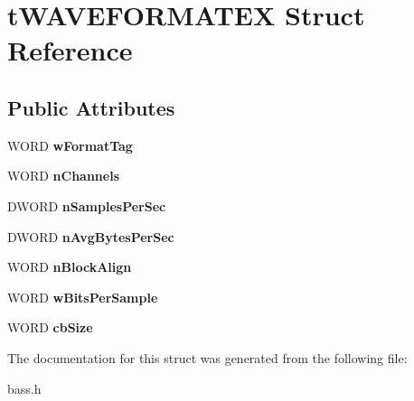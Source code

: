 \section{t\+W\+A\+V\+E\+F\+O\+R\+M\+A\+T\+E\+X Struct Reference}
\label{structt_w_a_v_e_f_o_r_m_a_t_e_x}
\subsection*{Public Attributes}
\begin{DoxyCompactItemize}
\item 
W\+O\+R\+D {\bfseries w\+Format\+Tag}\label{structt_w_a_v_e_f_o_r_m_a_t_e_x_aec624a88d0d94d7789c60dcc1418d6fc}

\item 
W\+O\+R\+D {\bfseries n\+Channels}\label{structt_w_a_v_e_f_o_r_m_a_t_e_x_ae71090e815279542a4f2ffea72ff1a07}

\item 
D\+W\+O\+R\+D {\bfseries n\+Samples\+Per\+Sec}\label{structt_w_a_v_e_f_o_r_m_a_t_e_x_ad3a2f0a0aed0d8b3a5f6afad5f8b6acc}

\item 
D\+W\+O\+R\+D {\bfseries n\+Avg\+Bytes\+Per\+Sec}\label{structt_w_a_v_e_f_o_r_m_a_t_e_x_a933a772d450a8a8939fc96d1eb15c672}

\item 
W\+O\+R\+D {\bfseries n\+Block\+Align}\label{structt_w_a_v_e_f_o_r_m_a_t_e_x_abb977590324e3d1b5a14f94b806b8ec1}

\item 
W\+O\+R\+D {\bfseries w\+Bits\+Per\+Sample}\label{structt_w_a_v_e_f_o_r_m_a_t_e_x_a888d33f1b1415c903bfa95ebedc78516}

\item 
W\+O\+R\+D {\bfseries cb\+Size}\label{structt_w_a_v_e_f_o_r_m_a_t_e_x_a179487978b7d541067d6200524ceff2c}

\end{DoxyCompactItemize}


The documentation for this struct was generated from the following file\+:\begin{DoxyCompactItemize}
\item 
bass.\+h\end{DoxyCompactItemize}
